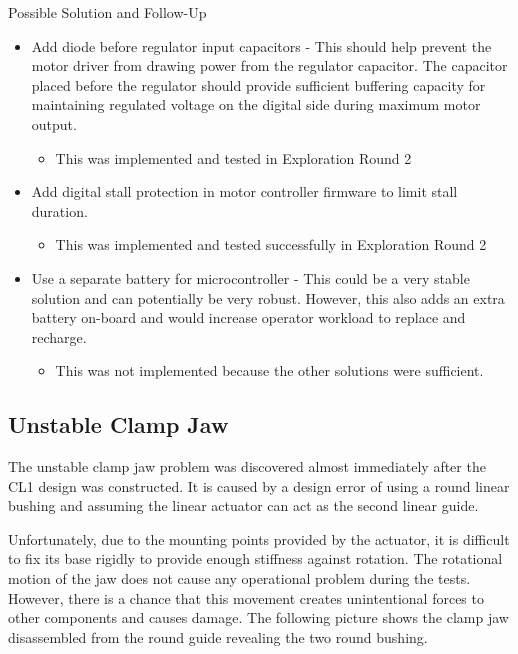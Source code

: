 Possible Solution and Follow-Up
\begin{itemize}
    \item Add diode before regulator input capacitors - This should help prevent the motor driver from drawing power from the regulator capacitor. The capacitor placed before the regulator should provide sufficient buffering capacity for maintaining regulated voltage on the digital side during maximum motor output.
    \begin{itemize}
        \item This was implemented and tested in Exploration Round 2 
    \end{itemize}
    \item Add digital stall protection in motor controller firmware to limit stall duration. 
    \begin{itemize}
        \item This was implemented and tested successfully in Exploration Round 2 
    \end{itemize}
    \item Use a separate battery for microcontroller - This could be a very stable solution and can potentially be very robust. However, this also adds an extra battery on-board and would increase operator workload to replace and recharge. 
    \begin{itemize}
        \item This was not implemented because the other solutions were sufficient.
    \end{itemize}
\end{itemize}

\subsection{Unstable Clamp Jaw}
\label{subsection:exploration-1-unstable-clamp-jaw}

The unstable clamp jaw problem was discovered almost immediately after the CL1 design was constructed. It is caused by a design error of using a round linear bushing and assuming the linear actuator can act as the second linear guide. 

Unfortunately, due to the mounting points provided by the actuator, it is difficult to fix its base rigidly to provide enough stiffness against rotation. The rotational motion of the jaw does not cause any operational problem during the tests. However, there is a chance that this movement creates unintentional forces to other components and causes damage. The following picture shows the clamp jaw disassembled from the round guide revealing the two round bushing.

